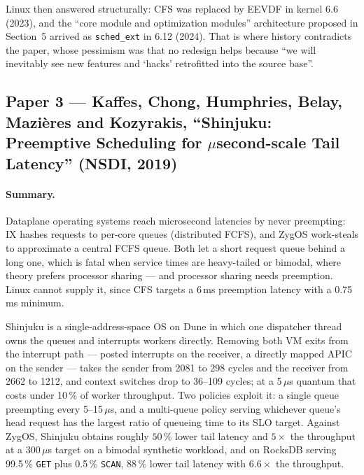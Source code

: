 Linux then answered structurally: CFS was replaced by EEVDF in kernel 6.6 (2023), and
the ``core module and optimization modules'' architecture proposed in Section~5 arrived
as \texttt{sched\_ext} in 6.12 (2024). That is where history contradicts the paper,
whose pessimism was that no redesign helps because ``we will inevitably see new features
and `hacks' retrofitted into the source base''.

\subsection*{Paper 3 --- Kaffes, Chong, Humphries, Belay, Mazi\`eres and Kozyrakis,
``Shinjuku: Preemptive Scheduling for $\mu$second-scale Tail Latency'' (NSDI, 2019)}

\paragraph{Summary.}
Dataplane operating systems reach microsecond latencies by never preempting: IX hashes
requests to per-core queues (distributed FCFS), and ZygOS work-steals to approximate a
central FCFS queue. Both let a short request queue behind a long one, which is fatal
when service times are heavy-tailed or bimodal, where theory prefers processor sharing
--- and processor sharing needs preemption. Linux cannot supply it, since CFS targets a
6\,ms preemption latency with a 0.75\,ms minimum.

Shinjuku is a single-address-space OS on Dune in which one dispatcher thread owns the
queues and interrupts workers directly. Removing both VM exits from the interrupt path
--- posted
interrupts on the receiver, a directly mapped APIC on the sender --- takes the sender
from 2081 to 298 cycles and the receiver from 2662 to 1212, and context switches drop to
36--109 cycles; at a 5\,$\mu$s quantum that costs under 10\,\% of worker throughput.
Two policies exploit it: a single queue preempting every 5--15\,$\mu$s, and a
multi-queue policy serving whichever queue's head request has the largest ratio of
queueing time to its SLO target. Against ZygOS, Shinjuku obtains roughly $50\,\%$ lower
tail latency and $5\times$ the throughput at a 300\,$\mu$s target on a bimodal synthetic
workload, and on RocksDB serving 99.5\,\% \texttt{GET} plus 0.5\,\% \texttt{SCAN},
$88\,\%$ lower tail latency with $6.6\times$ the throughput.

